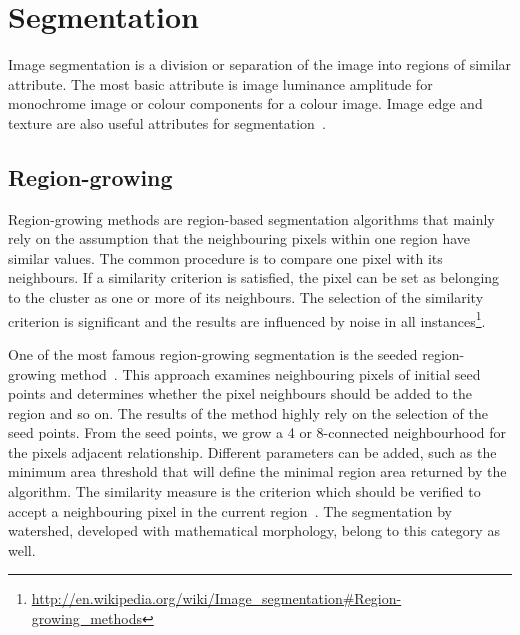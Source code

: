 



\section{Segmentation} %
\label{sub:ap:segmentation}
Image segmentation is a division or separation of the image into regions of similar attribute.
The most basic attribute is image luminance amplitude for monochrome image or colour components for a colour image.
Image edge and texture are also useful attributes for segmentation~\cite{Pratt2007Digital}.

\subsection{Region-growing} %
\label{sub:ap:region_growing}
Region-growing methods are region-based segmentation algorithms that mainly rely on the assumption that the neighbouring pixels within one region have similar values.
The common procedure is to compare one pixel with its neighbours.
If a similarity criterion is satisfied, the pixel can be set as belonging to the cluster as one or more of its neighbours.
The selection of the similarity criterion is significant and the results are influenced by noise in all instances\footnote{\url{http://en.wikipedia.org/wiki/Image_segmentation\#Region-growing_methods}}.

One of the most famous region-growing segmentation is the seeded region-growing method~\cite{adams1994seeded,mehnert1997improved}.
This approach examines neighbouring pixels of initial seed points and determines whether the pixel neighbours should be added to the region and so on.
The results of the method highly rely on the selection of the seed points.
From the seed points, we grow a 4 or 8-connected neighbourhood for the pixels adjacent relationship.
Different parameters can be added, such as the minimum area threshold that will define the minimal region area returned by the algorithm.
The similarity measure is the criterion which should be verified to accept a neighbouring pixel in the current region~\cite{Gonzalez1992Digital}.
The segmentation by watershed, developed with mathematical morphology, belong to this category as well.

